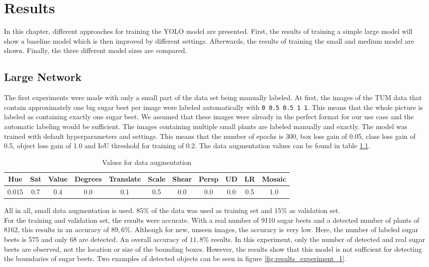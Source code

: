 
\chapter{Results}

In this chapter, different approaches for training the YOLO model are presented. First, the results of training a simple large model will show a baseline model which is then improved by different settings. Afterwards, the results of training the small and medium model are shown. Finally, the three different model sizes are compared.

\section{Large Network}

The first experiments were made with only a small part of the data set being manually labeled. At first, the images of the TUM data that contain approximately one big sugar beet per image were labeled automatically with \texttt{0 0.5 0.5 1 1}. This means that the whole picture is labeled as containing exactly one sugar beet. We assumed that these images were already in the perfect format for our use case and the automatic labeling would be sufficient. The images containing multiple small plants are labeled manually and exactly. The model was trained with default hyperparameters and settings. This means that the number of epochs is 300, box loss gain of 0.05, class loss gain of 0.5, object loss gain of 1.0 and IoU threshold for training of 0.2. The data augmentation values can be found in table \ref{tab:augmentation_exp1}.

\begin{table}[h!]
	\centering
	\begin{tabular}{|c c c c c c c c c c c|} 
		\hline
		Hue & Sat & Value & Degrees & Translate & Scale & Shear & Persp & UD & LR & Mosaic \\ %
		\hline
		0.015 & 0.7 & 0.4 & 0.0 & 0.1 & 0.5 & 0.0 & 0.0 & 0.0 & 0.5 & 1.0 \\
		\hline
	\end{tabular}
	\caption{Values for data augmentation}
	\label{tab:augmentation_exp1}
\end{table}

All in all, small data augmentation is used. $ 85\% $ of the data was used as training set and $ 15\% $ as validation set.\\

For the training and validation set, the results were accurate. With a real number of 9110 sugar beets and a detected number of plants of 8162, this results in an accuracy of $ 89,6\% $. Although for new, unseen images, the accuracy is very low. Here, the number of labeled sugar beets is 575 and only 68 are detected. An overall accuracy of $ 11,8\% $ results. In this experiment, only the number of detected and real sugar beets are observed, not the location or size of the bounding boxes. However, the results show that this model is not sufficient for detecting the boundaries of sugar beets. Two examples of detected objects can be seen in figure \ref{fig:results_experiment_1}.

